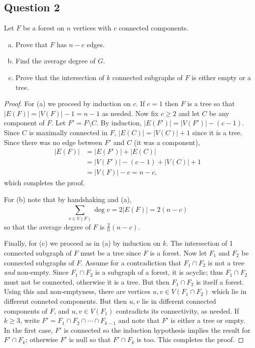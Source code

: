 \subsection{Question 2}

Let \( F \) be a forest on \( n \) vertices with \( c \) connected components. 
\begin{enumerate}[(a), leftmargin=1cm]
	\item Prove that \( F \) has \( n - c \) edges.
	\item Find the average degree of \( G \).
	\item Prove that the intersection of \( k \) connected subgraphs of \( F \) is either empty or a tree.
\end{enumerate}
\begin{proof} For (a) we proceed by induction on \( c \). If \( c = 1 \) then \( F \) is a tree so that \( |E(F)| = |V(F)| - 1 = n - 1 \) as needed. Now fix \( c \geq 2 \) and let \( C \) be any component of \( F \). Let \( F' = F \setminus C \). By induction, \( |E(F')| = |V(F')| - (c - 1) \). Since \( C \) is maximally connected in \( F \), \( |E(C)| = |V(C)| + 1 \) since it is a tree. Since there was no edge between \( F' \) and \( C \) (it was a component),
	\begin{align*}
		|E(F)| &= |E(F')| + |E(C)| \\
		       &= |V(F')| - (c - 1) + |V(C)| + 1 \\
		       &= |V(F)| - c = n - c,
	\end{align*}
	which completes the proof.

For (b) note that by handshaking and (a), \[ \sum_{v \in V(F)}^{} \deg v = 2 |E(F)| = 2(n - c)  \] so that the average degree of \( F \) is \(\frac{2}{n} (n-c).\)

Finally, for (c) we proceed as in (a) by induction on \( k \). The intersection of 1 connected subgraph of \( F \) must be a tree since \( F \) is a forest. Now let \( F_1 \) and \( F_2 \) be connected subgraphs of \( F \). Assume for a contradiction that \( F_1 \cap F_2 \) is not a tree \emph{and} non-empty. Since \( F_1 \cap F_2 \) is a subgraph of a forest, it is acyclic; thus \( F_1 \cap F_2 \) must not be connected, otherwise it is a tree. But then \( F_1 \cap F_2 \) is itself a forest. Using this and non-emptyness, there are vertices \( u,v \in V(F_1 \cap F_2) \) which lie in different conneted components. But then \( u,v \) lie in different connected components of \( F \), and \( u,v \in V(F_1) \) contradicts its connectivity, as needed. If \( k \geq 3 \), write \( F' = F_1 \cap F_2 \cap \cdots \cap F_{k-1}  \) and note that \( F' \) is either a tree or empty. In the first case, \( F' \) is connected so the induction hypothesis implies the result for \( F' \cap F_{k}  \); otherwise \( F' \) is null so that \( F' \cap F_{k}  \) is too. This completes the proof.
\end{proof}
